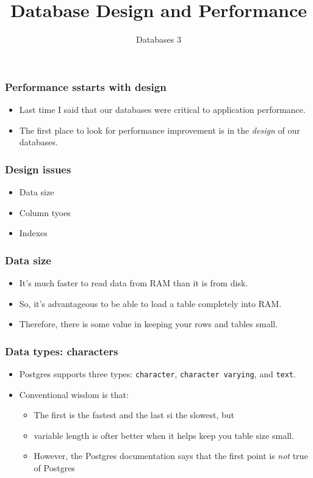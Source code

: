 \documentclass[10pt]{beamer}
\title{Database Design and Performance}
\author[IN705]{Databases 3}
\institute[Otago Polytechnic]{
  School of Information Technology \\
  Otago Polytechnic \\
  Dunedin, New Zealand \\
}
\date{}
\begin{document}
\begin{frame}[plain]
  \titlepage
\end{frame}


\begin{frame}
	\frametitle{Performance sstarts with design}
 \begin{itemize}
  \item Last time I said that our databases were critical to application performance.
  \item The first place to look for performance improvement is in the \emph{design} of our databases.
  \end{itemize}


\end{frame}


\begin{frame}
	\frametitle{Design issues}
 \begin{itemize}
  \item Data size
  \item Column tyoes
  \item Indexes
  \end{itemize}


\end{frame}

\begin{frame}
	\frametitle{Data size}
 \begin{itemize}
  \item It's much faster to read data from RAM than it is from disk.
  \item So, it's advantageous to be able to load a table completely into RAM.
  \item Therefore, there is some value in keeping your rows and tables small.
  \end{itemize}


\end{frame}

\begin{frame}
	\frametitle{Data types: characters}
 \begin{itemize}
  \item Postgres supports three types:  \texttt{character}, \texttt{character varying}, and \texttt{text}.
  \item Conventional wisdom is that:
	  \begin{itemize}
		  \item The first is the fastest and the last si the slowest, but
		  \item variable length is ofter better when it helps keep you table size small.
		  \item However, the Postgres documentation says that the first point is \emph{not} true of Postgres
	  \end{itemize}
  \end{itemize}


\end{frame}
\end{document}
